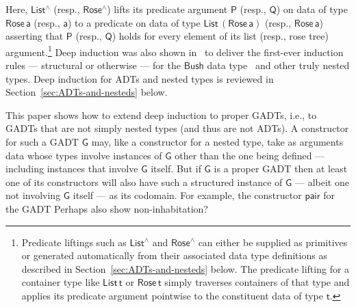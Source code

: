 \documentclass[9pt]{entcs}
\begin{document}
\noindent
Here, $\mathsf{List^\land}$ (resp., $\mathsf{Rose^\land}$) lifts its
predicate argument $\mathsf{P}$ (resp., $\mathsf{Q}$) on data of type
$\mathsf{Rose\,a}$ (resp., $\mathsf{a}$) to a predicate on data of
type $\mathsf{List\,(Rose\,a)}$ (resp., $\mathsf{Rose\,a}$) asserting
that $\mathsf{P}$ (resp., $\mathsf{Q}$) holds for every element of its
list (resp., rose tree) argument.\footnote{Predicate liftings such as
  $\mathsf{List^\land}$ and $\mathsf{Rose^\land}$ can either be
  supplied as primitives or generated automatically from their
  associated data type definitions as described in
  Section~\ref{sec:ADTs-and-nesteds} below. The predicate lifting for
  a container type like $\mathsf{List\,t}$ or $\mathsf{Rose\,t}$
  simply traverses containers of that type and applies its predicate
  argument pointwise to the constituent data of type $\mathsf{t}$.}
Deep induction was also shown in~\cite{jp20} to
deliver the first-ever induction rules --- structural or otherwise ---
for the $\mathsf{Bush}$ data type~\cite{bm98} and other truly nested
types. Deep induction for ADTs and nested types is reviewed in
Section~\ref{sec:ADTs-and-nesteds} below.

This paper shows how to extend deep induction to proper GADTs, i.e.,
to GADTs that are not simply nested types (and thus are not ADTs).  A
constructor for such a GADT $\mathsf{G}$ may, like a constructor for a
nested type, take as arguments data whose types involve instances of
$\mathsf{G}$ other than the one being defined --- including instances
that involve $\mathsf{G}$ itself. But if $\mathsf{G}$ is a proper GADT
then at least one of its constructors will also have such a structured
instance of $\mathsf{G}$ --- albeit one not involving $\mathsf{G}$
itself --- as its codomain.
For example, the constructor $\mathsf{pair}$ for the GADT {\color{red}
  Perhaps also show non-inhabitation?}

\vspace*{-0.1in}
\end{document}
